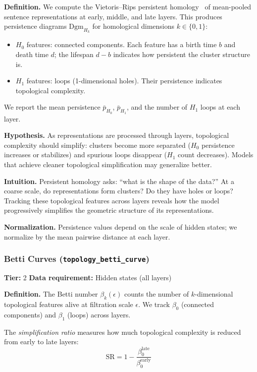 \documentclass[preprint]{neurips_2025}
\begin{document}
\textbf{Definition.}
We compute the Vietoris--Rips persistent homology~\citep{naitzat2020topology} of mean-pooled sentence representations at early, middle, and late layers. This produces persistence diagrams $\text{Dgm}_{H_k}$ for homological dimensions $k \in \{0, 1\}$:
\begin{itemize}
  \item $H_0$ features: connected components. Each feature has a birth time $b$ and death time $d$; the lifespan $d - b$ indicates how persistent the cluster structure is.
  \item $H_1$ features: loops (1-dimensional holes). Their persistence indicates topological complexity.
\end{itemize}
We report the mean persistence $\bar{p}_{H_0}$, $\bar{p}_{H_1}$, and the number of $H_1$ loops at each layer.

\textbf{Hypothesis.}
As representations are processed through layers, topological complexity should simplify: clusters become more separated ($H_0$ persistence increases or stabilizes) and spurious loops disappear ($H_1$ count decreases). Models that achieve cleaner topological simplification may generalize better.

\textbf{Intuition.}
Persistent homology asks: ``what is the shape of the data?'' At a coarse scale, do representations form clusters? Do they have holes or loops? Tracking these topological features across layers reveals how the model progressively simplifies the geometric structure of its representations.

\textbf{Normalization.} Persistence values depend on the scale of hidden states; we normalize by the mean pairwise distance at each layer.

\subsubsection{Betti Curves (\texttt{topology\_betti\_curve})}
\label{app:betti}

\textbf{Tier:} 2 \quad \textbf{Data requirement:} Hidden states (all layers)

\textbf{Definition.}
The Betti number $\beta_k(\epsilon)$ counts the number of $k$-dimensional topological features alive at filtration scale $\epsilon$. We track $\beta_0$ (connected components) and $\beta_1$ (loops) across layers.

The \emph{simplification ratio} measures how much topological complexity is reduced from early to late layers:
\begin{equation}
  \text{SR} = 1 - \frac{\beta_0^{\text{late}}}{\beta_0^{\text{early}}}
\end{equation}
\end{document}
